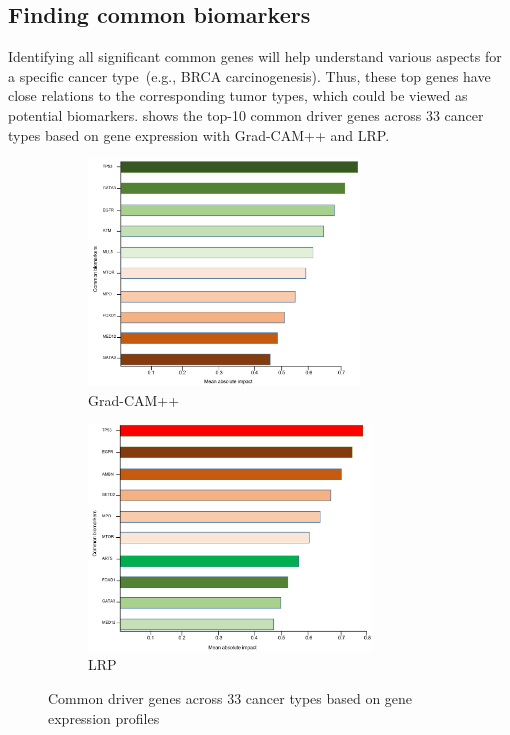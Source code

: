 \subsection{Finding common biomarkers}
Identifying all significant common genes will help understand various aspects for a specific cancer type~(e.g., BRCA carcinogenesis). Thus, these top genes have close relations to the corresponding tumor types, which could be viewed as potential biomarkers.  shows the top-10 common driver genes across 33 cancer types based on gene expression with Grad-CAM++ and LRP. 

\begin{figure}[h]
	\centering
	\begin{subfigure}{.48\linewidth}
		\centering
		\includegraphics[width=\linewidth,height=60mm]{images/gcam_fi.png}
		\caption{Grad-CAM++}
        \label{fig:comgenegcam}
	\end{subfigure}
	\begin{subfigure}{0.48\linewidth}
		\centering
		\includegraphics[width=\linewidth,height=60mm]{images/lrp_fi.png}
		\caption{LRP}
        \label{fig:comgeneglrp}
	\end{subfigure}
	\caption{Common driver genes across 33 cancer types based on gene expression profiles} 
	\label{fig:comgenes}
\end{figure}

